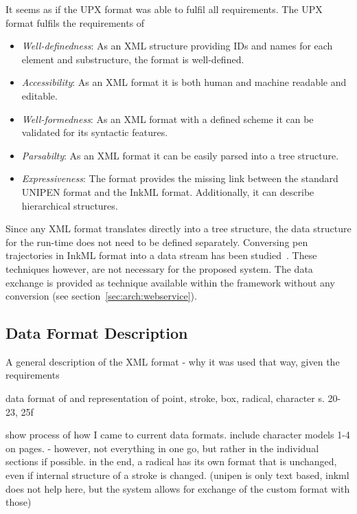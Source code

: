 It seems as if the UPX format was able to fulfil all requirements.
The UPX format fulfils the requirements of
\begin{itemize}
  \item \emph{Well-definedness}: As an XML structure providing IDs and names for 
        each element and substructure, the format is well-defined.

  \item \emph{Accessibility}: As an XML format it is both human and machine
        readable and editable.

  \item \emph{Well-formedness}: As an XML format with a defined scheme it can
        be validated for its syntactic features.

  \item \emph{Parsabilty}: As an XML format it can be easily parsed into a
        tree structure.

  \item \emph{Expressiveness}: The format provides the missing link between the
        standard UNIPEN format and the InkML format. Additionally, it can 
        describe hierarchical structures.
\end{itemize}
Since any XML format translates directly into a tree structure, the data 
structure for the run-time does not need to be defined separately.
Conversing pen trajectories in InkML format into a data stream has been 
studied~. These techniques however, are not necessary 
for the proposed system. The data exchange is provided as technique available
within the framework without any conversion (see 
section~\ref{sec:arch:webservice}).

\subsection{Data Format Description}
\label{sec:hwre:dataformatdescription}

  A general description of the XML format - why it was used that way,
  given the requirements

  data format of and representation of 
  point, stroke, box, radical, character s. 20-23, 25f

  show process of how I came to current data formats.
  include character models 1-4 on pages. - however, not everything in one go,
  but rather in the individual sections if possible.
  in the end, a radical has its own format that is unchanged, even
  if internal structure of a stroke is changed.
  (unipen is only text based, inkml does not help here, but the system allows
  for exchange of the custom format with those)


